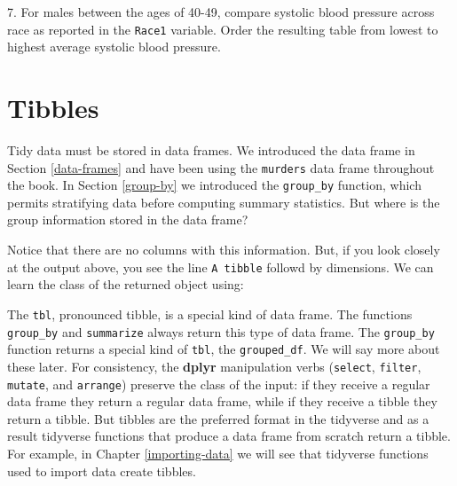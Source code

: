 \documentclass[
]{krantz}
\newenvironment{Shaded}{\begin{snugshade}}{\end{snugshade}}
\newcommand{\CommentTok}[1]{\textcolor[rgb]{0.37,0.37,0.37}{\textit{#1}}}
\newcommand{\KeywordTok}[1]{\textcolor[rgb]{0.27,0.27,0.27}{\textbf{#1}}}
\newcommand{\NormalTok}[1]{#1}
\newcommand{\OperatorTok}[1]{\textcolor[rgb]{0.43,0.43,0.43}{\textbf{#1}}}
\newcommand{\StringTok}[1]{\textcolor[rgb]{0.5,0.5,0.5}{#1}}
\begin{document}
7. For males between the ages of 40-49, compare systolic blood pressure across race as reported in the \texttt{Race1} variable. Order the resulting table from lowest to highest average systolic blood pressure.

\hypertarget{tibbles}{%
\section{Tibbles}\label{tibbles}}

Tidy data must be stored in data frames. We introduced the data frame in Section \ref{data-frames} and have been using the \texttt{murders} data frame throughout the book. In Section \ref{group-by} we introduced the \texttt{group\_by} function, which permits stratifying data before computing summary statistics. But where is the group information stored in the data frame?

\begin{Shaded}
\end{Shaded}

Notice that there are no columns with this information. But, if you look closely at the output above, you see the line \texttt{A\ tibble} followd by dimensions. We can learn the class of the returned object using:

\begin{Shaded}
\end{Shaded}

The \texttt{tbl}, pronounced tibble, is a special kind of data frame. The functions \texttt{group\_by} and \texttt{summarize} always return this type of data frame. The \texttt{group\_by} function returns a special kind of \texttt{tbl}, the \texttt{grouped\_df}. We will say more about these later. For consistency, the \textbf{dplyr} manipulation verbs (\texttt{select}, \texttt{filter}, \texttt{mutate}, and \texttt{arrange}) preserve the class of the input: if they receive a regular data frame they return a regular data frame, while if they receive a tibble they return a tibble. But tibbles are the preferred format in the tidyverse and as a result tidyverse functions that produce a data frame from scratch return a tibble. For example, in Chapter \ref{importing-data} we will see that tidyverse functions used to import data create tibbles.
\end{document}
